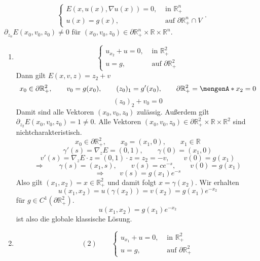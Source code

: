 
	\[
		\begin{cases}
			E(x,u(x), \nabla u(x)) = 0 , &\text{ in }\mathbb{R}^n_+\\
			u(x) = g(x), & \text{ auf } \partial \mathbb{R}^n_+ \cap V
		\end{cases}.
	\]
$\partial_{z_n} E(x_0,v_0,z_0) \neq 0$ für $(x_0,v_0,z_0) \in \partial \mathbb{R}^n_+ \times \mathbb{R} \times \mathbb{R}^n$.

\begin{beispiele}
	\begin{enumerate}[1.]
		\item \[
			\begin{cases}
				u_{x_2} + u = 0, &\text{ in }\mathbb{R}^2_+\\
				u=g , & \text{ auf } \partial \mathbb{R}^2_+
			\end{cases}
		\]
		Dann gilt $E(x,v,z) = z_2 +v$
		\[
			x_0 \in \partial \mathbb{R}^2_+, \qquad v_0 = g(x_0), \qquad (z_0)_1 = g'(x_0), \qquad \partial \mathbb{R}^2_+ = \set{x_2 = 0}
		\]
		\[
			(z_0)_2 + v_0 = 0
		\]
		Damit sind alle Vektoren $(x_0,v_0,z_0)$ zulässig. Außerdem gilt $\partial_{z_2}E(x_0,v_0,z_0) = 1 \neq 0$. Alle Vektoren $(x_0,v_0,z_0) \in \partial \mathbb{R}^2_+ \times \mathbb{R} \times \mathbb{R}^2$ sind nichtcharakteristisch.
		\[
			x_0 \in \partial \mathbb{R}^2_+, \qquad x_0 = (x_1,0), \qquad x_1 \in \mathbb{R}
		\]
		\[
			\gamma'(s) =  \nabla_z E = (0,1), \qquad \gamma(0) = (x_1,0) 
		\]
		\[
			v'(s) =  \nabla_z E \cdot z = (0,1) \cdot z = z_2 = -v , \qquad v(0)= g(x_1)
		\]
		\[
			\Rightarrow \qquad \gamma(s) = (x_1,s), \qquad v(s) = c e^{-s}, \qquad v(0) = g(x_1)
		\]
		\[
			\Rightarrow \qquad v(s) = g(x_1) e^{-s}
		\]
		Also gilt $(x_1,x_2) = x \in \mathbb{R}^2_+$ und damit folgt $x= \gamma(x_2)$. Wir erhalten
		\[
			u(x_1,x_2) = u(\gamma(x_2)) = v(x_2) = g(x_1) e^{-x_2}
		\]für $g \in C^1(\partial \mathbb{R}^2_+)$. 
		\[
			u(x_1,x_2) = g(x_1)e^{-x_2} 
		\]
		ist also die globale klassische Lösung.
		\item
		\[
		(2) \qquad 	\begin{cases}
				u_{x_1}+u =0, &\text{ in }\mathbb{R}^2_+\\
				u=g, &\text{ auf } \partial \mathbb{R}^2_+
				

\end{cases}\]
\end{enumerate}
\end{beispiele}
